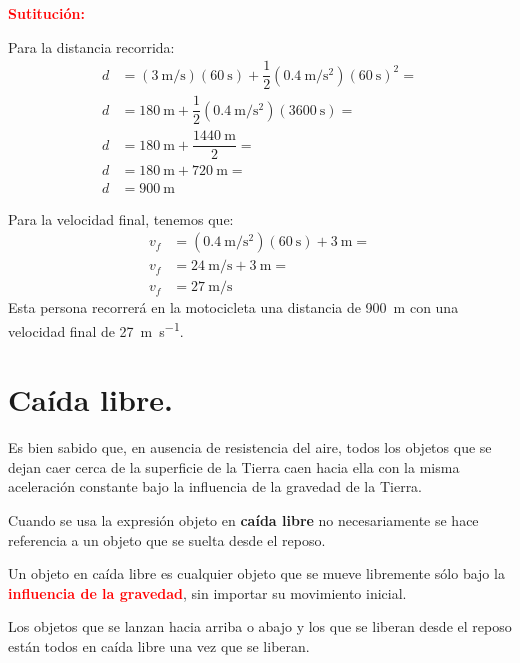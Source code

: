 \documentclass[14pt]{extarticle}
\newcommand{\textocolor}[2]{\textbf{\textcolor{#1}{#2}}}
\begin{document}
\vspace*{0.3cm}
\textocolor{red}{Sutitución:}

\vspace*{0.5cm}
Para la distancia recorrida:
\begin{align*}
d &= \left( \SI[per-mode=fraction]{3}{\meter\per\second} \right)(\SI{60}{\second}) + \dfrac{1}{2} \left(\SI[per-mode=fraction]{0.4}{\meter\per\square\second} \right)(\SI{60}{\second})^{2} = \\[0.5em]
d &= \SI{180}{\meter} + \dfrac{1}{2} \left(\SI[per-mode=fraction]{0.4}{\meter\per\square\second} \right)(\SI{3600}{\second}) = \\[0.5em]
d &= \SI{180}{\meter} + \dfrac{\SI{1440}{\meter}}{2} = \\[0.5em]
d &= \SI{180}{\meter} + \SI{720}{\meter} = \\[0.5em]
d &= \SI{900}{\meter}
\end{align*}

Para la velocidad final, tenemos que:
\begin{align*}
v_{f} &= \left( \SI[per-mode=fraction]{0.4}{\meter\per\square\second} \right) (\SI{60}{\second}) + \SI{3}{\meter} = \\[0.5em]
v_{f} &= \SI[per-mode=fraction]{24}{\meter\per\second} + \SI{3}{\meter} = \\[0.5em]
v_{f} &= \SI[per-mode=fraction]{27}{\meter\per\second}
\end{align*}
Esta persona recorrerá en la motocicleta una distancia de \SI{900}{\meter} con una velocidad final de \SI{27}{\meter\per\second}.

\section{Caída libre.}

Es bien sabido que, en ausencia de resistencia del aire, todos los objetos que se dejan caer cerca de la superficie de la Tierra caen hacia ella con la misma aceleración constante bajo la influencia de la gravedad de la Tierra.

Cuando se usa la expresión objeto en \textocolor{ao}{caída libre} no necesariamente se hace referencia a un objeto que se suelta desde el reposo.

Un objeto en caída libre es cualquier objeto que se mueve libremente sólo bajo la \textocolor{red}{influencia de la gravedad}, sin importar su movimiento inicial.

Los objetos que se lanzan hacia arriba o abajo y los que se liberan desde el reposo están todos en caída libre una vez que se liberan.
\end{document}
